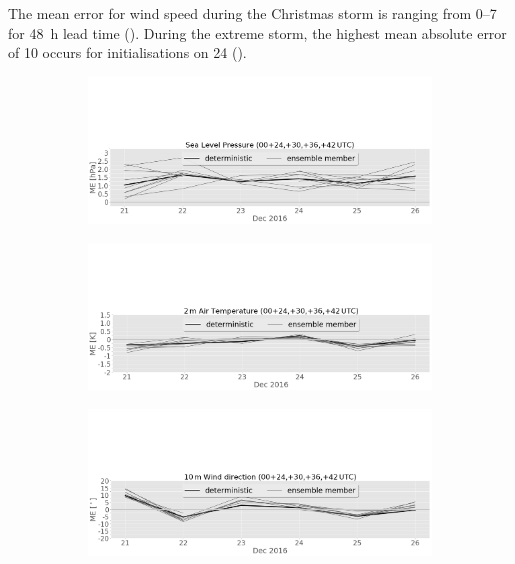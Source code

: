 The mean error for wind speed during the Christmas storm is ranging from \SIrange{0}{7}{\mPs} for \SI{48}{\hour} lead time ().
During the extreme storm, the highest mean absolute error of \SI{10}{\mPs} occurs for initialisations on \SI{24}{\dec} ().
\begin{figure}[H]%
	\centering
	\begin{subfigure}[b]{\textwidth}
		\includegraphics[trim={0cm 0cm 0cm 9.5cm},clip,width=\textwidth]{./fig_sfc_pressure/ME_20161220_26_00}
		\caption{}\label{fig:bias:pres}
	\end{subfigure}
	\begin{subfigure}[b]{\textwidth}
		\includegraphics[trim={0cm 0cm 0cm 9.5cm},clip,width=\textwidth]{./fig_sfc_temp/ME_20161220_26_00}
		\caption{}\label{fig:bias:temp}
	\end{subfigure}
	\begin{subfigure}[b]{\textwidth}
		\includegraphics[trim={0cm 0cm 0cm 9.5cm},clip,width=\textwidth]{./fig_sfc_wd/ME_20161220_26_00}

\end{subfigure}
\end{figure}
